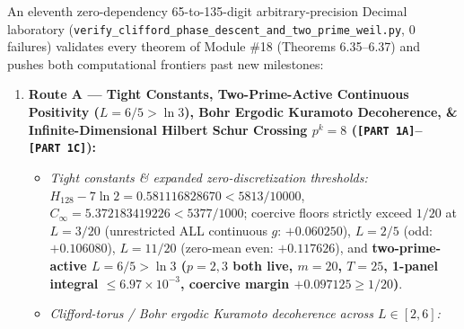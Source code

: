 \documentclass[
  11pt,
]{article}
\providecommand{\tightlist}{%
  \setlength{\itemsep}{0pt}\setlength{\parskip}{0pt}}
\begin{document}
An eleventh zero-dependency 65-to-135-digit arbitrary-precision Decimal
laboratory
(\texttt{verify\_clifford\_phase\_descent\_and\_two\_prime\_weil.py}, 0
failures) validates every theorem of Module \#18 (Theorems 6.35--6.37)
and pushes both computational frontiers past new milestones:

\begin{enumerate}
\def\labelenumi{\arabic{enumi}.}
\tightlist
\item
  \textbf{Route A --- Tight Constants, Two-Prime-Active Continuous
  Positivity (\(L = 6/5 > \ln 3\)), Bohr Ergodic Kuramoto Decoherence,
  \& Infinite-Dimensional Hilbert Schur Crossing \(p^k = 8\)
  (\texttt{{[}PART\ 1A{]}}--\texttt{{[}PART\ 1C{]}}):}

  \begin{itemize}
  \tightlist
  \item
    \emph{Tight constants \& expanded zero-discretization thresholds:}
    \(H_{128} - 7\ln 2 = 0.581116828670 < 5813/10000\),
    \(C_\infty = 5.372183419226 < 5377/1000\); coercive floors strictly
    exceed \(1/20\) at \(L = 3/20\) (unrestricted ALL continuous \(g\):
    \(+0.060250\)), \(L = 2/5\) (odd: \(+0.106080\)), \(L = 11/20\)
    (zero-mean even: \(+0.117626\)), and \textbf{two-prime-active
    \(L = 6/5 > \ln 3\) (\(p = 2, 3\) both live, \(m = 20\), \(T = 25\),
    1-panel integral \(\le 6.97 \times 10^{-3}\), coercive margin
    \(+0.097125 \ge 1/20\))}.
  \item
    \emph{Clifford-torus / Bohr ergodic Kuramoto decoherence across
    \(L \in [2, 6]\):}
  \end{itemize}


\end{enumerate}
\end{document}
